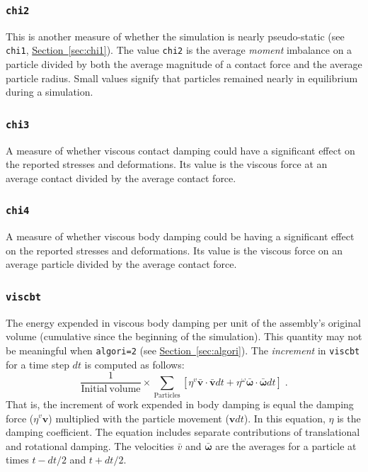 \documentclass[letterpaper,11pt]{article}
\begin{document}
\subsubsection{\texttt{chi2}}\label{sec:chi2}
This is another measure of whether the simulation is nearly
pseudo-static
(see \texttt{chi1}, \hyperref[sec:chi1]{Section~\ref*{sec:chi1}}).
The value \texttt{chi2} is the average \emph{moment} imbalance on a 
particle divided by both the average magnitude of a contact force and the
average particle radius.
Small values signify that particles remained nearly in equilibrium 
during a simulation.
%
\subsubsection{\texttt{chi3}}
A measure of whether viscous contact damping could 
have a significant effect
on the reported stresses and deformations.
Its value is the viscous force at an average contact divided
by the average contact force.
%
\subsubsection{\texttt{chi4}}\label{sec:chi4}
A measure of whether viscous body damping could 
be having a significant effect
on the reported stresses and deformations.
Its value is the viscous force on an average particle divided
by the average contact force.
%
\subsubsection{\texttt{viscbt}}
The energy expended in viscous body damping per unit of the
assembly's original volume
(cumulative since the beginning of the simulation).  This quantity may not
be meaningful when \texttt{algori=2}
(see \hyperref[sec:algori]{Section~\ref*{sec:algori}}).
The \emph{increment} in \texttt{viscbt} for a time step $dt$
is computed as follows:
\begin{equation}
\frac{1}{\mathrm{Initial\ volume}}
\times
\sum_{\text{Particles}} \left[
\eta^{v}\mathbf{\bar{v}}\cdot\mathbf{\bar{v}}dt
+
\eta^{\omega}\bar{\boldsymbol{\omega}}\cdot\bar{\boldsymbol{\omega}}dt
\right]\;.
\end{equation}
That is, the increment of work expended in body damping is equal
the damping force ($\eta^{v}\mathbf{v}$) 
multiplied with the particle movement ($\mathbf{v}dt$).
In this equation, $\eta$ is the damping coefficient.
The equation includes separate contributions of translational and
rotational damping.
The velocities $\bar{v}$ and $\bar{\boldsymbol{\omega}}$ are the
averages for a particle at times $t-dt/2$ and $t+dt/2$.
%
\end{document}
